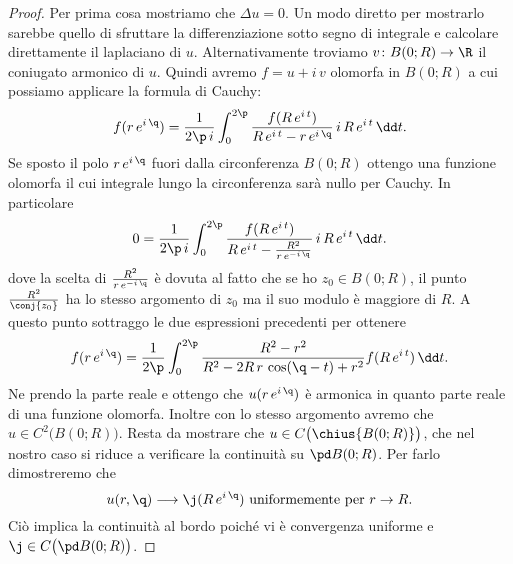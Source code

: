 \begin{proof}
	Per prima cosa mostriamo che \(\Delta u=0\). Un modo diretto per mostrarlo sarebbe quello di sfruttare la differenziazione sotto segno di integrale e calcolare direttamente il laplaciano di \(u\).
	Alternativamente troviamo \(v\colon B(0;R) \to \R\) il coniugato armonico di \(u\). Quindi avremo \(f=u+i\,v\) olomorfa in \(B(0;R)\) a cui possiamo applicare la formula di Cauchy:
	\[
		f(r\,e^{i\,\q}) = \frac{1}{2\p\,i} \int_0^{2\p} \frac{f(R\,e^{i\,t})}{R\,e^{i\,t}-r\,e^{i\,\q}}\,i\,R\,e^{i\,t}\,\dd t.
	\]
	Se sposto il polo \(r\,e^{i\,\q}\) fuori dalla circonferenza \(B(0;R)\) ottengo una funzione olomorfa il cui integrale lungo la circonferenza sarà nullo per Cauchy. In particolare
	\[
		0 = \frac{1}{2\p\,i} \int_0^{2\p} \frac{f(R\,e^{i\,t})}{R\,e^{i\,t}-\frac{R^2}{r\,e^{-i\,\q}}}\,i\,R\,e^{i\,t}\,\dd t.
	\]
	dove la scelta di \(\frac{R^2}{r\,e^{-i\,\q}}\) è dovuta al fatto che se ho \(z_0\in B(0;R)\), il punto \(\frac{R^2}{\conj{z_0}}\) ha lo stesso argomento di \(z_0\) ma il suo modulo è maggiore di \(R\).
	A questo punto sottraggo le due espressioni precedenti per ottenere
	\[
		f(r\,e^{i\,\q}) =  \frac{1}{2\p} \int_0^{2\p} \frac{R^2-r^2}{R^2-2R\,r\,\cos(\q-t)+r^2}f(R\,e^{i\,t})\,\dd t.
	\]
	Ne prendo la parte reale e ottengo che \(u(r\,e^{i\,\q})\) è armonica in quanto parte reale di una funzione olomorfa. Inoltre con lo stesso argomento avremo che \(u\in C^2\big(B(0;R)\big)\).
	Resta da mostrare che \(u\in C\big(\chius{B(0;R)}\big)\), che nel nostro caso si riduce a verificare la continuità su \(\pd B(0;R)\). Per farlo dimostreremo che
	\[
		u(r,\q) \longrightarrow \j(R\,e^{i\,\q}) \text{ uniformemente per }r \to R.
	\]
	Ciò implica la continuità al bordo poiché vi è convergenza uniforme e \(\j\in C\big(\pd B(0;R)\big)\).
	

\end{proof}
